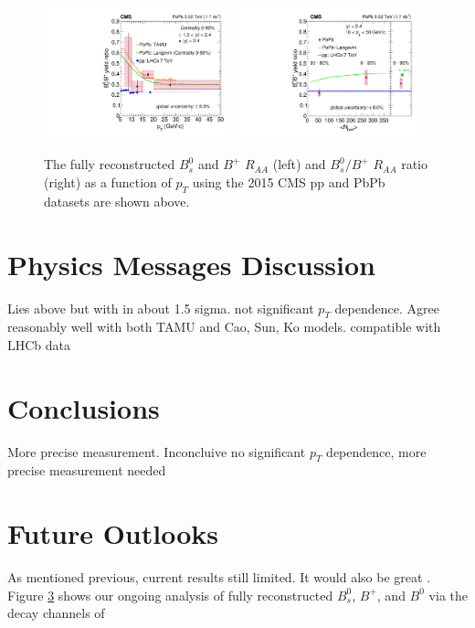 \begin{figure}[hbtp]
\begin{center}
\includegraphics[width=0.48\textwidth]{Figures/Chapter6/ratio_bsbu_vsPt.pdf}
\includegraphics[width=0.48\textwidth]{Figures/Chapter6/ratio_bsbu_vsCent.pdf}
\caption{The fully reconstructed $B^0_s$ and $B^+$ $R_{AA}$ (left) and $B^0_s/B^+$ $R_{AA}$ ratio (right) as a function of $p_T$ using the 2015 CMS pp and PbPb datasets are shown above.}
\label{FinalResults}
\end{center}
\end{figure}   
 

\section{Physics Messages Discussion}

Lies above but with in about 1.5 sigma. not significant $p_T$ dependence. Agree reasonably well with both TAMU and Cao, Sun, Ko models. compatible with LHCb data


\section{Conclusions}

More precise measurement. Inconcluive no significant $p_T$ dependence, more precise measurement needed 

\section{Future Outlooks}

As mentioned previous, current results still limited. It would also be great . Figure \ref{} shows our ongoing analysis of fully reconstructed $B^0_s$, $B^+$, and $B^0$ via the decay channels of 


